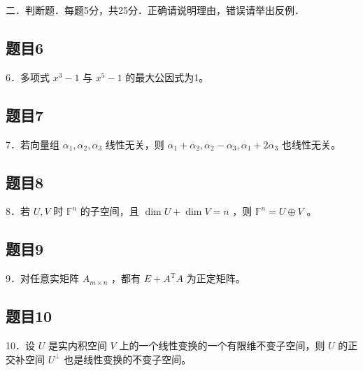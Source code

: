 \documentclass{article}
\begin{document}
二．判断题．每题5分，共25分．正确请说明理由，错误请举出反例．\\

\subsection{题目6}
6．多项式 \(x^{3}-1\) 与 \(x^{5}-1\) 的最大公因式为1。

\subsection{题目7}
7．若向量组 \(\alpha_{1}, \alpha_{2}, \alpha_{3}\) 线性无关，则 \(\alpha_{1}+\alpha_{2}, \alpha_{2}-\alpha_{3}, \alpha_{1}+2 \alpha_{3}\) 也线性无关。

\subsection{题目8}
8．若 \(U, V\) 时 \(\mathbb{F}^{n}\) 的子空间，且 \(\operatorname{dim} U+\operatorname{dim} V=n\) ，则 \(\mathbb{F}^{n}=U \oplus V\) 。

\subsection{题目9}
9．对任意实矩阵 \(A_{m \times n}\) ，都有 \(E+A^{\mathrm{T}} A\) 为正定矩阵。

\subsection{题目10}
10．设 \(U\) 是实内积空间 \(V\) 上的一个线性变换的一个有限维不变子空间，则 \(U\) 的正交补空间 \(U^{\perp}\) 也是线性变换的不变子空间。
\end{document}
